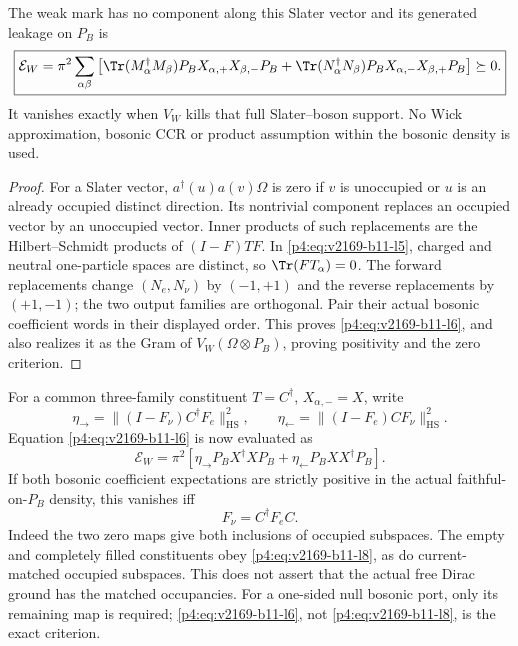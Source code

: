 \documentclass[12pt,a4paper]{article}
\begin{document}
\begin{theorem}
\label{p4:v2169:b11:thm:weakslater}
The weak mark has no component along this Slater vector and its generated
leakage on $P_B$ is
\begin{equation}
 \boxed{\mathcal E_W=\pi^2\sum_{\alpha\beta}
 \left[
 \Tr(M_\alpha^\dagger M_\beta)P_BX_{\alpha,+}X_{\beta,-}P_B
 +\Tr(N_\alpha^\dagger N_\beta)P_BX_{\alpha,-}X_{\beta,+}P_B
 \right]\succeq0.}
 \label{p4:eq:v2169-b11-l6}
\end{equation}
It vanishes exactly when $V_W$ kills that full Slater--boson support.
No Wick approximation, bosonic CCR or product assumption within the
bosonic density is used.
\end{theorem}
\begin{proof}
For a Slater vector, $a^\dagger(u)a(v)\Omega$ is zero if $v$ is unoccupied
or $u$ is an already occupied distinct direction. Its nontrivial component
replaces an occupied vector by an unoccupied vector. Inner products of such
replacements are the Hilbert--Schmidt products of $(I-F)TF$.
In \eqref{p4:eq:v2169-b11-l5}, charged and neutral one-particle spaces are distinct, so
$\Tr(FT_\alpha)=0$. The forward replacements change $(N_e,N_\nu)$ by
$(-1,+1)$ and the reverse replacements by $(+1,-1)$; the two output
families are orthogonal. Pair their actual bosonic coefficient words in their
displayed order. This proves \eqref{p4:eq:v2169-b11-l6}, and also realizes it as the Gram of
$V_W(\Omega\otimes P_B)$, proving positivity and the zero criterion.
\end{proof}

For a common three-family constituent $T=C^\dagger$, $X_{\alpha,-}=X$,
write
\[
 \eta_\to=\|(I-F_\nu)C^\dagger F_e\|_{\mathrm{HS}}^2,\qquad
 \eta_\leftarrow=\|(I-F_e)CF_\nu\|_{\mathrm{HS}}^2.
\]
Equation \eqref{p4:eq:v2169-b11-l6} is now evaluated as
\begin{equation}
 \boxed{\mathcal E_W=\pi^2[
       \eta_\to P_BX^\dagger XP_B+
       \eta_\leftarrow P_BXX^\dagger P_B].}
 \label{p4:eq:v2169-b11-l7}
\end{equation}
If both bosonic coefficient expectations are strictly positive in the
actual faithful-on-$P_B$ density, this vanishes iff
\begin{equation}
 \boxed{F_\nu=C^\dagger F_eC.} \label{p4:eq:v2169-b11-l8}
\end{equation}
Indeed the two zero maps give both inclusions of occupied subspaces.
The empty and completely filled constituents obey \eqref{p4:eq:v2169-b11-l8}, as do current-matched
occupied subspaces. This does not assert that the actual free Dirac
ground has the matched occupancies. For a one-sided null bosonic port,
only its remaining map is required; \eqref{p4:eq:v2169-b11-l6}, not \eqref{p4:eq:v2169-b11-l8}, is the exact criterion.
\end{document}
